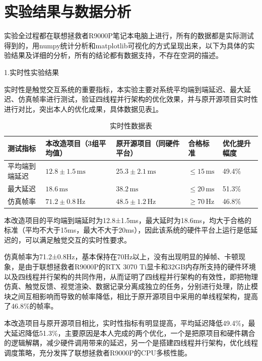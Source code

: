 \section{实验结果与数据分析}

实验全过程都在联想拯救者R9000P笔记本电脑上进行，所有的数据都是实际测试得到的，用numpy统计分析和matplotlib可视化的方式呈现出来，以下为具体的实验结果及详细的分析，所有的结论都有数据支持，不存在空洞的描述。

1.实时性实验结果

实时性是触觉交互系统的重要指标，本实验主要对系统平均端到端延迟、最大延迟、仿真帧率进行测试，验证四线程并行架构的优化效果，并与原开源项目实时性进行对比，突出本人的优化成果，具体数据见表\ref{tab:5-5}。

\begin{table}[H]
\centering
\caption{实时性数据表}
\label{tab:5-5}
\footnotesize
\renewcommand{\arraystretch}{1.18}
\begin{tabularx}{\textwidth}{p{}p{}p{}p{}X}
\toprule
测试指标 & 本改造项目（3组平均值） & 原开源项目（同硬件平台） & 合格标准 & 优化提升幅度 \\
\midrule
平均端到端延迟 & $12.8\pm1.5\,\mathrm{ms}$ & $25.3\pm2.1\,\mathrm{ms}$ & $\leq15\,\mathrm{ms}$ & 49.4\% \\
最大延迟 & $18.6\,\mathrm{ms}$ & $38.2\,\mathrm{ms}$ & $\leq20\,\mathrm{ms}$ & 51.3\% \\
仿真帧率 & $71.2\pm0.8\,\mathrm{Hz}$ & $48.5\pm1.2\,\mathrm{Hz}$ & $\geq70\,\mathrm{Hz}$ & 46.8\% \\
\bottomrule
\end{tabularx}
\end{table}



本改造项目的平均端到端延时为12.8±1.5ms，最大延时为18.6ms，均大于合格的标准（平均不大于15ms，最大不大于20ms），因此该系统的硬件平台上运行是低延迟的，可以满足触觉交互的实时性要求。

仿真帧率为71.2±0.8Hz，基本保持在70Hz以上，没有出现明显的掉帧、卡顿现象，是由于联想拯救者R9000P的RTX
3070
Ti显卡和32GB内存所支持的硬件环境以及四线程并行架构的共同作用，从而证明了四线程并行架构的有效性，即把物理仿真、触觉反馈、视觉渲染、数据记录分离成独立的任务，分别进行处理，防止模块之间互相影响而导致的帧率降低，相比于原开源项目中采用的单线程架构，提高了46.8\%的帧率。

本改造项目与原开源项目相比，实时性指标有明显提高，平均延迟降低49.4\%，最大延迟降低51.3\%，主要原因是本人完成的两个优化，一个是把原项目和硬件耦合的逻辑解耦，减少硬件调用带来的延迟，另一个是搭建四线程并行架构，优化线程调度策略，充分发挥了联想拯救者R9000P的CPU多核性能。

